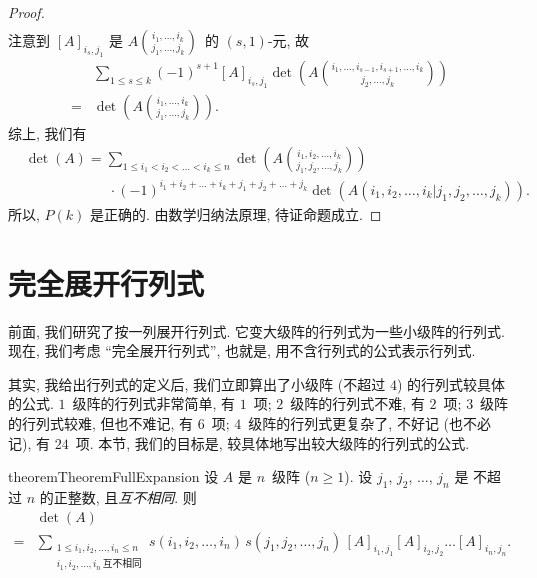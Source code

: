 \begin{proof}
\begin{align*}
    \end{align*}
    注意到 \([A]_{i_s,j_1}\) 是
    \(\displaystyle
    A\binom{i_1, \dots, i_k}
    {j_1, \dots, j_k}\)~的
    \((s, 1)\)-元, 故
    \begin{align*}
             & \sum_{1 \leq s \leq k}
        {(-1)^{s+1} [A]_{i_s,j_1}
            \det {\left(
                A\binom{i_1, \dots, i_{s-1}, i_{s+1}, \dots, i_k}
                {j_2, \dots, j_k}
                \right)}}
        \\
        = {} & \det {\left(
            A\binom{i_1, \dots, i_k}
            {j_1, \dots, j_k}
            \right)}.
    \end{align*}
    综上, 我们有
    \begin{align*}
         &
        \det {(A)}
        = \sum_{1 \leq i_1 < i_2 < \dots < i_k \leq n}
        {\det {\left(
                A\binom{i_1, i_2, \dots, i_k}
                {j_1, j_2, \dots, j_k}
                \right)}}
        \\
         &
        \qquad \qquad \qquad
        \cdot (-1)^{i_1 + i_2 + \dots + i_k
            + j_1 + j_2 + \dots + j_k}
        \det {(A({i_1,i_2,\dots,i_k}|{j_1,j_2,\dots,j_k}))}.
    \end{align*}
    所以, \(P(k)\) 是正确的.
    由数学归纳法原理, 待证命题成立.
\end{proof}

\KunAsteriskoEnEnhavtabelo
\section{完全展开行列式}
\SenAsteriskoEnEnhavtabelo

\maldevigalegajxo

前面, 我们研究了按一列展开行列式.
它变大级阵的行列式为一些小级阵的行列式.
现在, 我们考虑 ``完全展开行列式'',
也就是, 用不含行列式的公式表示行列式.

其实, 我给出行列式的定义后,
我们立即算出了小级阵 (不超过 \(4\))
的行列式较具体的公式.
\(1\)~级阵的行列式非常简单, 有 \(1\)~项;
\(2\)~级阵的行列式不难, 有 \(2\)~项;
\(3\)~级阵的行列式较难, 但也不难记, 有 \(6\)~项;
\(4\)~级阵的行列式更复杂了, 不好记 (也不必记),
有 \(24\)~项.
本节, 我们的目标是,
较具体地写出较大级阵的行列式的公式.

\begin{restatable}[]{theorem}{TheoremFullExpansion}
    设 \(A\) 是 \(n\)~级阵 (\(n \geq 1\)).
    设 \(j_1\), \(j_2\), \(\dots\), \(j_n\) 是%
    不超过 \(n\) 的正整数,
    且\emph{互不相同}.
    则
    \begin{align*}
             & \det {(A)}
        \\
        = {} &
        \sum_{\substack{
        1 \leq i_1, i_2, \dots, i_n \leq n \\
                i_1, i_2, \dots, i_n\,\text{互不相同}
            }}
        {s(i_1, i_2, \dots, i_n)\,
            s(j_1, j_2, \dots, j_n)\,
            [A]_{i_1,j_1} [A]_{i_2,j_2} \dots [A]_{i_n,j_n}}.
    \end{align*}
\end{restatable}

